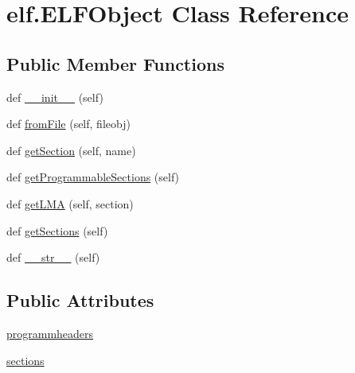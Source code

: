 \hypertarget{clasself_1_1_e_l_f_object}{}\section{elf.\+E\+L\+F\+Object Class Reference}
\label{clasself_1_1_e_l_f_object}
\subsection*{Public Member Functions}
\begin{DoxyCompactItemize}
\item 
def \hyperlink{clasself_1_1_e_l_f_object_a45c0baf8f9236c388e45f4734716a501}{\+\_\+\+\_\+init\+\_\+\+\_\+} (self)
\item 
def \hyperlink{clasself_1_1_e_l_f_object_ac492e1803d76598a74cb12e30e65bde7}{from\+File} (self, fileobj)
\item 
def \hyperlink{clasself_1_1_e_l_f_object_aa69c832e97425118be14d4446bbaf15e}{get\+Section} (self, name)
\item 
def \hyperlink{clasself_1_1_e_l_f_object_a2baf01c2cd04e72f396f7e81cf61aa98}{get\+Programmable\+Sections} (self)
\item 
def \hyperlink{clasself_1_1_e_l_f_object_acacdc06fcdfbed163f0ba471a0327e63}{get\+L\+MA} (self, section)
\item 
def \hyperlink{clasself_1_1_e_l_f_object_a33f5ce20de17698bb43ba043dc7513f0}{get\+Sections} (self)
\item 
def \hyperlink{clasself_1_1_e_l_f_object_a66f18263b6956147be1f68bb50a947a7}{\+\_\+\+\_\+str\+\_\+\+\_\+} (self)
\end{DoxyCompactItemize}
\subsection*{Public Attributes}
\begin{DoxyCompactItemize}
\item 
\hyperlink{clasself_1_1_e_l_f_object_aaa4f49d3a9ec29974a7b6109eb765c53}{programmheaders}
\item 
\hyperlink{clasself_1_1_e_l_f_object_aef845ed33797cb0c16b6ab31b104f062}{sections}
\end{DoxyCompactItemize}
